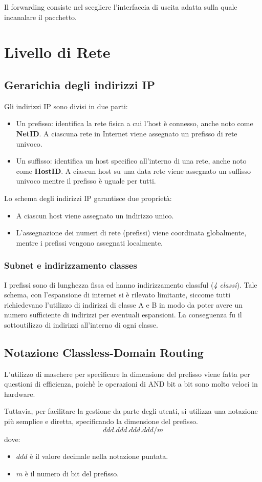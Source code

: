 \documentclass[oneside,a4paper,11pt]{book}
\theoremstyle{italicstyle}
\theoremstyle{normStyle}
\begin{document}
Il forwarding consiste nel scegliere l'interfaccia
di uscita adatta sulla quale incanalare il pacchetto. 
\section{Livello di Rete}
\subsection{Gerarichia degli indirizzi IP}
Gli indirizzi IP sono divisi in due parti:
\begin{itemize}
  \item Un prefisso: identifica la rete fisica a cui l'host è connesso, 
  anche noto come \textbf{NetID}. A ciascuna rete in Internet viene assegnato 
  un prefisso di rete univoco.
  \item Un suffisso: identifica un host specifico all'interno  di una 
  rete, anche noto come \textbf{HostID}. A ciascun host su una data rete viene 
  assegnato un suffisso univoco mentre il prefisso è uguale per tutti.
\end{itemize}
Lo schema degli indirizzi IP garantisce due proprietà:
\begin{itemize}
  \item A ciascun host viene assegnato un indirizzo unico.
  \item L'assegnazione dei numeri di rete (prefissi) viene coordinata 
  globalmente, mentre i prefissi vengono assegnati localmente.
\end{itemize}
\subsubsection{Subnet e indirizzamento classes}
I prefissi sono di lunghezza fissa ed hanno indirizzamento classful (\textit{4 classi}).
Tale schema, con l'espansione di internet si è rilevato limitante, siccome tutti richiedevano 
l'utilizzo di indirizzi di classe A e B in modo da poter avere un numero sufficiente di indirizzi 
per eventuali espansioni. La conseguenza fu il sottoutilizzo di indirizzi all'interno di ogni classe.
\subsection{Notazione Classless-Domain Routing}
L'utilizzo di maschere per specificare la dimensione del prefisso viene fatta per 
questioni di efficienza, poichè le operazioni di AND bit a bit sono molto veloci in hardware.

Tuttavia, per facilitare la gestione da parte degli utenti, si utilizza una
notazione più semplice e diretta, specificando la dimensione del prefisso.
\[
  ddd.ddd.ddd.ddd/m
\]
dove:
\begin{itemize}
  \item $ddd$ è il valore decimale nella notazione puntata.
  \item $m$ è il numero di bit del prefisso.
\end{itemize}
\end{document}
